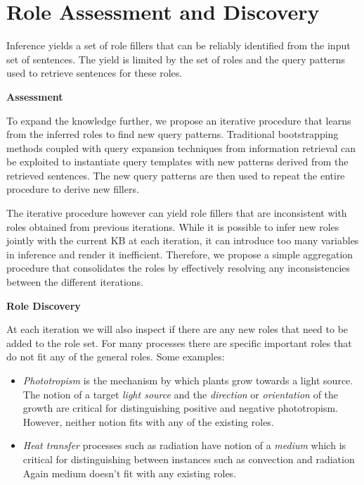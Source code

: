 \section{Role Assessment and Discovery}

Inference yields a set of role fillers that can be reliably identified from the input set of sentences. 
The yield is limited by the set of roles and the query patterns used to retrieve sentences for these roles.

{\bf Assessment}

To expand the knowledge further, we propose an iterative procedure that learns from the inferred roles to find new query patterns. 
Traditional bootstrapping methods coupled with query expansion techniques from information retrieval 
can be exploited to instantiate query templates with new patterns derived from the retrieved sentences. 
The new query patterns are then used to repeat the entire procedure to derive new fillers. 

The iterative procedure however can yield role fillers that are inconsistent with roles obtained from previous iterations.
While it is possible to infer new roles jointly with the current KB at each iteration, it can introduce too many variables in inference and render it inefficient.
Therefore, we propose a simple aggregation procedure that consolidates the roles by effectively resolving any inconsistencies between the different iterations.

{\bf Role Discovery}

At each iteration we will also inspect if there are any new roles that need to be added to the role set.
For many processes there are specific important roles that do not fit any of the general roles. Some examples:
	\begin{itemize}
		\item {\em Phototropism} is the mechanism by which plants grow towards a light source. 
		The notion of a target {\em light source} and the {\em direction} or {\em orientation} of the growth
		are critical for distinguishing positive and negative phototropism. However, neither notion fits
		with any of the existing roles. 
	\item {\em Heat transfer} processes such as radiation have notion of a {\em medium} 
		which is critical for distinguishing between instances such as convection and radiation
		Again medium doesn't fit with any existing roles. 
	\end{itemize}


